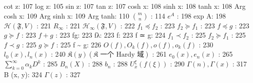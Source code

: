 cot z: 107 log z: 105 sin z: 107 tan z: 107 cosh x: 108 sinh x: 108 tanh x: 108 Arg cosh x: 109 Arg sinh x: 109 Arg tanh: 110 \(\binom{m}{n}\) : 114 \(e^{A}\) : 198 exp A: 198 \(\mathcal{H}(\mathfrak{F}, V)\) : 221 \(R_{\infty}\) : 221 \(\mathcal{H}_{\infty}(\mathfrak{F}, V)\) : 222 \(f_{1} \preccurlyeq f_{2}\) : 223 \(f_{2} \succcurlyeq f_{1}\) : 223 \(f \preccurlyeq g\) : 223 \(g \succcurlyeq f\) : 223 \(f + g\) : 223 fg: 223 fλ: 223 \textbar\textbar f\textbar\textbar: 223 f ≃ g: 224 \(f_{1} \prec f_{2}\) : 225 \(f_{2} \succcurlyeq f_{1}\) : 225 \(f \prec g\) : 225 \(g \succcurlyeq f\) : 225 f \textasciitilde{} g: 226 \(O(f), O_{k}(f), o(f), o_{k}(f)\) : 230 \(l_{0}(x), l_{n}(x)\) : 240 \(\mathfrak{K}(y) (\mathfrak{K} \text{ 一个 Hardy 域})\) : 261 \(e_{0}(x), e_{n}(x)\) : 265 \(\sum_{k=0}^{\infty} \alpha_{k} D^{k}\) : 285 \(B_{n}(X)\) : 288 \(b_{n}\) : 288 \(U_{x}^{\xi}(f(\xi))\) : 290 \(\Gamma(n), \Gamma(x)\) : 317 B (x, y): 324 \(\Gamma(z)\) : 327

